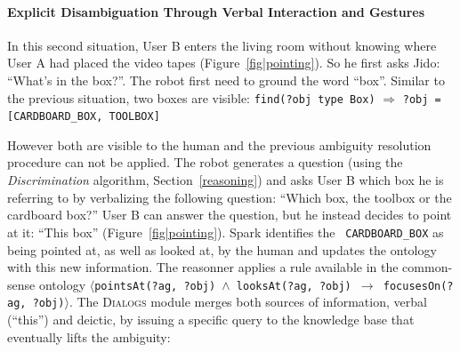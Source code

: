 \documentclass[preprint,3p,times]{elsarticle}
\newcommand{\concept}[1]{{\small \texttt{#1}}}
\newcommand{\stmt}[1]{{\footnotesize\tt$\langle$#1\relax$\rangle$}}
\begin{document}
%
\paragraph{Explicit Disambiguation Through Verbal Interaction and Gestures}

In this second situation, User B enters the living room without knowing where
User A had placed the video tapes (Figure~\ref{fig|pointing}). So he first asks
Jido: ``What's in the box?''. The robot first need to ground the word ``box''.
Similar to the previous situation, two boxes are visible: \concept{find(?obj
type Box)} $\Rightarrow$ \concept{?obj = [CARDBOARD\_BOX, TOOLBOX]}

However both are visible to the human and the previous ambiguity resolution
procedure can not be applied. The robot generates a question (using the
\emph{Discrimination} algorithm, Section~\ref{reasoning})
and asks User B which box he is referring to by verbalizing the following question: ``Which box, the toolbox or the
cardboard box?'' User B can answer the question, but he instead decides to point
at it: ``This box'' (Figure~\ref{fig|pointing}). {\sc Spark} identifies the {\tt
CARDBOARD\_BOX} as being pointed at, as well as looked at, by the human and updates the
ontology with this new information. The reasonner applies a rule available in the common-sense
ontology \stmt{pointsAt(?ag, ?obj) $\land$ looksAt(?ag, ?obj) $\to$
focusesOn(?ag, ?obj)}. The \textsc{Dialogs} module merges both
sources of information, verbal (``this'') and deictic, by issuing a specific
query to the knowledge base that eventually lifts the ambiguity:
\end{document}
